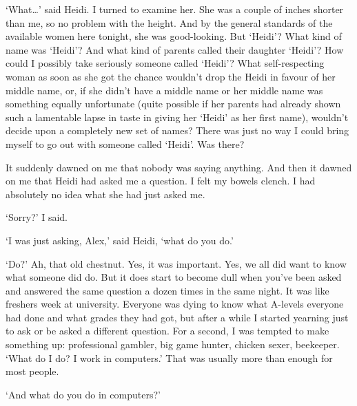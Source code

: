 `What\dots' said Heidi. I turned to examine her. She was a couple of
inches shorter than me, so no problem with the height. And by the
general standards of the available women here tonight, she was
good-looking. But `Heidi'? What kind of name was `Heidi'? And what
kind of parents called their daughter `Heidi'? How could I possibly
take seriously someone called `Heidi'? What self-respecting woman as
soon as she got the chance wouldn't drop the Heidi in favour of her
middle name, or, if she didn't have a middle name or her middle name
was something equally unfortunate (quite possible if her parents had
already shown such a lamentable lapse in taste in giving her `Heidi'
as her first name), wouldn't decide upon a completely new set of
names? There was just no way I could bring myself to go out with
someone called `Heidi'. Was there?

It suddenly dawned on me that nobody was saying anything. And then
it dawned on me that Heidi had asked me a question. I felt my bowels
clench. I had absolutely no idea what she had just asked me.

`Sorry?' I said.

`I was just asking, Alex,' said Heidi, `what do you do.'

`Do?' Ah, that old chestnut. Yes, it was important. Yes, we all did
want to know what someone did do. But it does start to become dull
when you've been asked and answered the same question a dozen times
in the same night. It was like freshers week at university. Everyone
was dying to know what A-levels everyone had done and what grades
they had got, but after a while I started yearning just to ask or be
asked a different question. For a second, I was tempted to make
something up: professional gambler, big game hunter, chicken sexer, beekeeper.
`What do I do? I work in computers.' That was usually more than
enough for most people.

`And what do you do in computers?'

